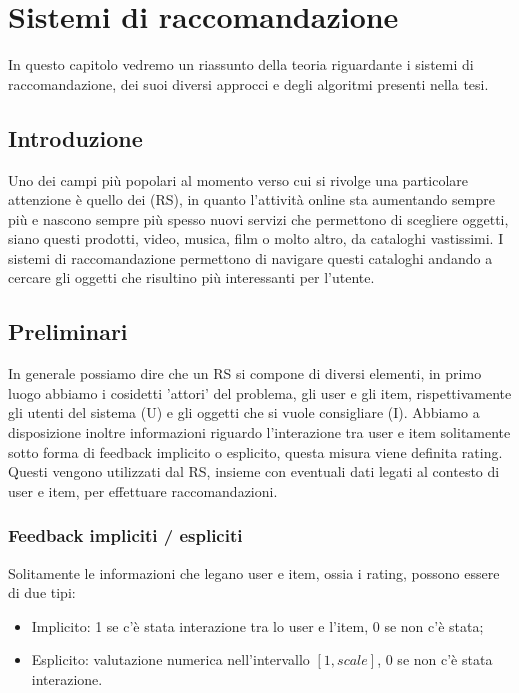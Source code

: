 
\hypertarget{(chap:capitolo3)}{}
\chapter{Sistemi di raccomandazione}
In questo capitolo vedremo un riassunto della teoria riguardante i sistemi di raccomandazione, dei suoi diversi approcci e degli algoritmi presenti nella tesi.
\section{Introduzione}
Uno dei campi più popolari al momento verso cui si rivolge una particolare attenzione è quello dei  (RS), in quanto l'attività online sta aumentando sempre più e nascono sempre più spesso nuovi servizi che permettono di scegliere oggetti, siano questi prodotti, video, musica, film o molto altro, da cataloghi vastissimi. I sistemi di raccomandazione permettono di navigare questi cataloghi andando a cercare gli oggetti che risultino più interessanti per l'utente.

\section{Preliminari}
In generale possiamo dire che un RS si compone di diversi elementi, in primo luogo abbiamo i cosidetti 'attori' del problema, gli user e gli item, rispettivamente gli utenti del sistema (U) e gli oggetti che si vuole consigliare (I). Abbiamo a disposizione inoltre informazioni riguardo l'interazione tra user e item solitamente sotto forma di feedback implicito o esplicito, questa misura viene definita rating. Questi vengono utilizzati dal RS, insieme con eventuali dati legati al contesto di user e item, per effettuare raccomandazioni.

\subsection{Feedback impliciti / espliciti}
Solitamente le informazioni che legano user e item, ossia i rating, possono essere di due tipi:
\begin{itemize}
	\item Implicito: 1 se c'è stata interazione tra lo user e l'item, 0 se non c'è stata;
	\item Esplicito: valutazione numerica nell'intervallo $[1,scale]$, 0 se non c'è stata interazione.
\end{itemize}

